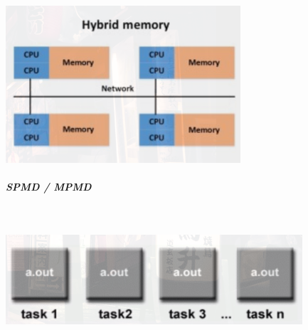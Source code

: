 \documentclass[8pt,twoside,landscape]{extarticle}
\begin{document}
\begin{multicols}{5}
{
\begin{center}
\includegraphics[width=.9\linewidth]{img/hybrid_memory_architecture.png}
\end{center}
\label{fig:hybrid-memory-architecture}
}
\subparagraph{SPMD / MPMD} \
\label{sec:org8a92af3}
{
\begin{center}
\includegraphics[width=.9\linewidth]{img/spmd_model.png}
\end{center}
\label{fig:spmd}
}


\end{multicols}
\end{document}
